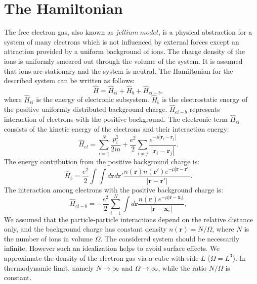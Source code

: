 \documentclass[twoside,english]{uiofysmaster}
\begin{document}
\section{The Hamiltonian}
The free electron gas, also known as $jellium\ model$, is a physical
abstraction for a system of many electrons which is not influenced by
external forces except an attraction provided by a uniform background
of ions. The charge density of the ions is uniformly smeared out through
the volume of the system. It is assumed that ions are stationary and
the system is neutral.  The Hamiltonian for the described system can
be written as follows:
\begin{equation}
\hat{H}=\hat{H}_{el}+\hat{H}_{b}+\hat{H}_{el-b},
\end{equation}
where $\hat{H}_{el}$ is the energy of electronic subsystem. $\hat{H}_{b}$ is the electrostatic energy of the positive uniformly distributed background charge. $\hat{H}_{el-b}$ represents interaction of electrons with the positive background.
The electronic term $\hat{H}_{el}$ consists of the kinetic energy of the electrons and their interaction energy:
\begin{equation}
\hat{H}_{el}=\sum_{i=1}^N\frac{p_i^2}{2m}+\frac{e^2}{2}\sum_{i\ne j}\frac{e^{-\mu |\mathbf{r}_i-\mathbf{r}_j|}}{|\mathbf{r}_i-\mathbf{r}_j|}.
\end{equation}
The energy contribution from the positive background charge is:
\begin{equation}
\hat{H}_{b}=\frac{e^2}{2}\int\int d\mathbf{r}d\mathbf{r}'\frac{n(\mathbf{r})n(\mathbf{r}')e^{-\mu |\mathbf{r}-\mathbf{r}'|}}{|\mathbf{r}-\mathbf{r}'|}.
\end{equation}
The interaction among electrons with the positive background charge is:
\begin{equation}
\hat{H}_{el-b}=-\frac{e^2}{2}\sum_{i=1}^N\int d\mathbf{r}\frac{n(\mathbf{r})e^{-\mu |\mathbf{r}-\mathbf{x}_i|}}{|\mathbf{r}-\mathbf{x}_i|},
\end{equation}
We assumed that the particle-particle interactions depend on the relative distance only, and the background charge has constant density $n(\mathbf{r}) = N/\Omega$, where $N$ is the number of ions in volume $\Omega$.
The considered system should be necessarily infinite. However such an idealization helps to avoid surface effects.  
We approximate the density of the  electron gas via a cube with side $L$ ($\Omega = L^3$). In thermodynamic limit, namely $N \rightarrow \infty$ and $\Omega \rightarrow \infty$, while the ratio $N/\Omega$ is  constant.
\end{document}
